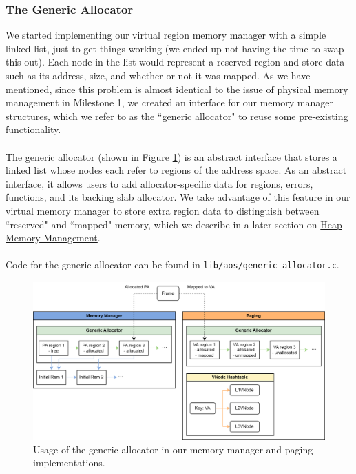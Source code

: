 \subsubsection{The Generic Allocator}\label{m2-2}
We started implementing our virtual region memory manager with a simple linked list, just to get things working (we ended up not having the time to swap this out). Each node in the list would represent a reserved region and store data such as its address, size, and whether or not it was mapped. As we have mentioned, since this problem is almost identical to the issue of physical memory management in Milestone 1, we created an interface for our memory manager structures, which we refer to as the ``generic allocator" to reuse some pre-existing functionality.
\\\\
The generic allocator (shown in Figure \ref{figure:m2_diagram}) is an abstract interface that stores a linked list whose nodes each refer to regions of the address space. As an abstract interface, it allows users to add allocator-specific data for regions, errors, functions, and its backing slab allocator. We take advantage of this feature in our virtual memory manager to store extra region data to distinguish between ``reserved" and ``mapped" memory, which we describe in a later section on \hyperref[m2-4]{Heap Memory Management}. 
\\\\
Code for the generic allocator can be found in \texttt{lib/aos/generic\_allocator.c}.
\begin{figure}[ht]
    \centering
    \includegraphics[width=0.8\columnwidth]{images/m2_diagram.png}
    \caption{Usage of the generic allocator in our memory manager and paging implementations.}
    \label{figure:m2_diagram}
\end{figure}
\\\\

